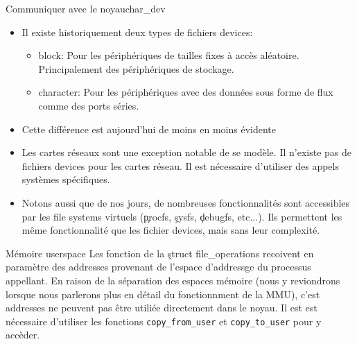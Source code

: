 \begin{frame}[fragile=singleslide]{Communiquer avec le noyau}{char\_dev}
  \begin{itemize} 
  \item Il existe historiquement deux types de fichiers devices:
    \begin{itemize}
    \item  block: Pour  les  périphériques de  tailles  fixes à  accès
      aléatoire. Principalement des périphériques de stockage.
    \item  character: Pour  les  périphériques avec  des données  sous
      forme de flux comme des ports séries.
    \end{itemize} 
  \item Cette différence est aujourd'hui de moins en moins évidente
  \item Les cartes réseaux sont une exception notable de se modèle. Il
    n'existe pas de  fichiers devices pour les cartes  réseau.  Il est
    nécessaire d'utiliser des appels systèmes spécifiques.
  \item Notons  aussi que de nos jours,  de nombreuses fonctionnalités
    sont  accessibles  par  les  file  systems  virtuels  (\c{procfs},
    \c{sysfs},   \c{debugfs},  etc...).   Ils   permettent  les   même
    fonctionnalité que les fichier devices, mais sans leur complexité.
  \end{itemize} 
\end{frame}

\begin{frame}[fragile=singleslide]{Mémoire userspace}
  Les fonction de la \c{struct file_operations} recoivent en paramètre
  des  addresses  provenant   de  l'espace  d'addressge  du  processus
  appellant. En  raison de la  séparation des espaces mémoire  (nous y
  reviondrons lorsque  nous parlerons plus en  détail du fonctionnment
  de la MMU), c'est addresses  ne peuvent pas être utiliée directement
  dans  le  noyau. Il  est  est  nécessaire  d'utiliser les  fonctions
  \verb+copy_from_user+ et \verb+copy_to_user+ pour y accèder.
\end{frame}
  

